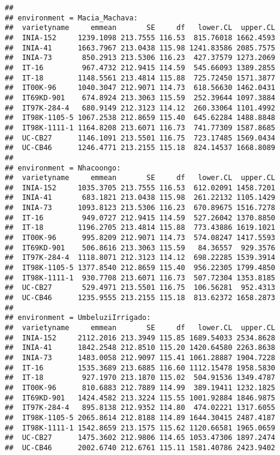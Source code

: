 \documentclass[]{book}
\theoremstyle{definition}
\theoremstyle{definition}
\theoremstyle{definition}
\theoremstyle{remark}
\begin{document}
\begin{verbatim}
## 
## environment = Macia_Machava:
##  varietyname     emmean       SE     df   lower.CL  upper.CL
##  INIA-152     1239.1098 213.7555 116.53  815.76018 1662.4593
##  INIA-41      1663.7967 213.0438 115.98 1241.83586 2085.7575
##  INIA-73       850.2913 213.5306 116.23  427.37579 1273.2069
##  IT-16         967.4732 212.9415 114.59  545.66093 1389.2855
##  IT-18        1148.5561 213.4814 115.88  725.72450 1571.3877
##  IT00K-96     1040.3047 212.9071 114.73  618.56630 1462.0431
##  IT69KD-901    674.8924 213.3063 115.59  252.39644 1097.3884
##  IT97K-284-4   680.9149 212.3123 114.12  260.33064 1101.4992
##  IT98K-1105-5 1067.2538 212.8659 115.40  645.62284 1488.8848
##  IT98K-1111-1 1164.8208 213.6071 116.73  741.77309 1587.8685
##  UC-CB27      1146.1091 213.5501 116.75  723.17485 1569.0434
##  UC-CB46      1246.4771 213.2155 115.18  824.14537 1668.8089
## 
## environment = Nhacoongo:
##  varietyname     emmean       SE     df   lower.CL  upper.CL
##  INIA-152     1035.3705 213.7555 116.53  612.02091 1458.7201
##  INIA-41       683.1821 213.0438 115.98  261.22132 1105.1429
##  INIA-73      1093.8123 213.5306 116.23  670.89675 1516.7278
##  IT-16         949.0727 212.9415 114.59  527.26042 1370.8850
##  IT-18        1196.2705 213.4814 115.88  773.43886 1619.1021
##  IT00K-96      995.8209 212.9071 114.73  574.08247 1417.5593
##  IT69KD-901    506.8616 213.3063 115.59   84.36557  929.3576
##  IT97K-284-4  1118.8071 212.3123 114.12  698.22285 1539.3914
##  IT98K-1105-5 1377.8540 212.8659 115.40  956.22305 1799.4850
##  IT98K-1111-1  930.7708 213.6071 116.73  507.72304 1353.8185
##  UC-CB27       529.4971 213.5501 116.75  106.56281  952.4313
##  UC-CB46      1235.9555 213.2155 115.18  813.62372 1658.2873
## 
## environment = UmbeluziIrrigado:
##  varietyname     emmean       SE     df   lower.CL  upper.CL
##  INIA-152     2112.2016 213.3949 115.85 1689.54033 2534.8628
##  INIA-41      1842.2548 212.8510 115.20 1420.64580 2263.8638
##  INIA-73      1483.0058 212.9097 115.41 1061.28887 1904.7228
##  IT-16        1535.3689 213.6885 116.60 1112.15478 1958.5830
##  IT-18         927.1970 213.1870 115.02  504.91536 1349.4787
##  IT00K-96      810.6883 212.7889 114.99  389.19411 1232.1825
##  IT69KD-901   1424.4582 213.3224 115.55 1001.92884 1846.9875
##  IT97K-284-4   895.8138 212.9352 114.80  474.02221 1317.6055
##  IT98K-1105-5 2065.8614 212.8188 114.89 1644.30415 2487.4187
##  IT98K-1111-1 1542.8659 213.1575 115.62 1120.66581 1965.0659
##  UC-CB27      1475.3602 212.9806 114.65 1053.47306 1897.2474
##  UC-CB46      2002.6740 212.6761 115.11 1581.40786 2423.9402

\end{verbatim}
\end{document}
